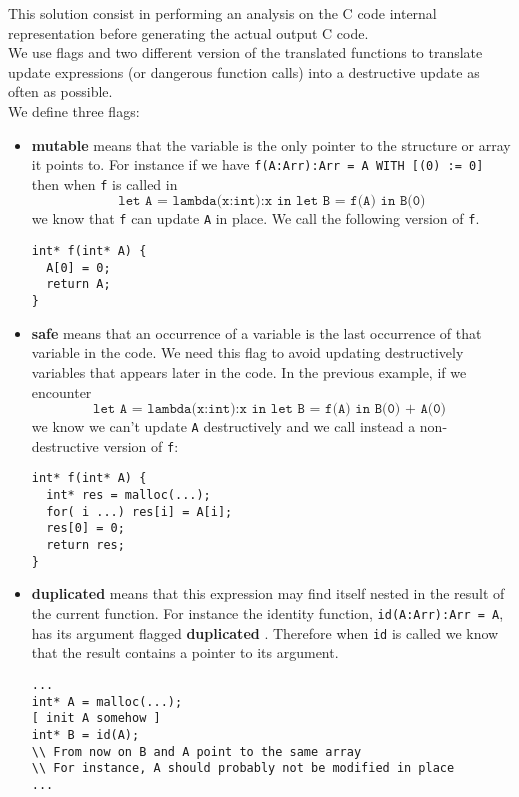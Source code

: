 \documentclass[12pt,a4paper]{article}
\newcommand{\cl}[1]{\texttt{#1}}
\newcommand{\bang}{ \textbf{ mutable } }
\newcommand{\safe}{ \textbf{ safe } }
\newcommand{\dupl}{ \textbf{ duplicated } }
\begin{document}
This solution consist in performing an analysis on the C code internal representation before generating the actual output C code.\\

We use flags and two different version of the translated functions to translate update expressions (or dangerous function calls) into a destructive update as often as possible.\\


We define three flags:
\begin{itemize}
\item \bang means that the variable is the only pointer to the structure or array it points to. For instance if we have \cl{f(A:Arr):Arr = A WITH [(0) := 0]} then when \cl{f} is called in
$$ \cl{let A = lambda(x:int):x in let B = f(A) in B(0)} $$
we know that \cl{f} can update \cl{A} in place. We call the following version of \cl{f}.
\begin{lstlisting}
int* f(int* A) {
  A[0] = 0;
  return A;
}
\end{lstlisting}

\item \safe means that an occurrence of a variable is the last occurrence of that variable in the code. We need this flag to avoid updating destructively variables that appears later in the code. In the previous example, if we encounter
$$ \cl{let A = lambda(x:int):x in let B = f(A) in B(0) + A(0) }$$
we know we can't update \cl{A} destructively and we call instead a non-destructive version of \cl{f}:
\begin{lstlisting}
int* f(int* A) {
  int* res = malloc(...);
  for( i ...) res[i] = A[i];
  res[0] = 0;
  return res;
}
\end{lstlisting}

\item \dupl means that this expression may find itself nested in the result of the current function. For instance the identity function, \cl{id(A:Arr):Arr = A}, has its argument flagged \dupl. Therefore when \cl{id} is called we know that the result contains a pointer to its argument.
\begin{lstlisting}
...
int* A = malloc(...);
[ init A somehow ]
int* B = id(A);
\\ From now on B and A point to the same array
\\ For instance, A should probably not be modified in place
...
\end{lstlisting}
\end{itemize}
\end{document}
